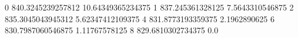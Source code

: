 0 840.3245239257812 10.64349365234375
1 837.245361328125 7.5643310546875
2 835.3045043945312 5.62347412109375
4 831.8773193359375 2.1962890625
6 830.7987060546875 1.11767578125
8 829.6810302734375 0.0
